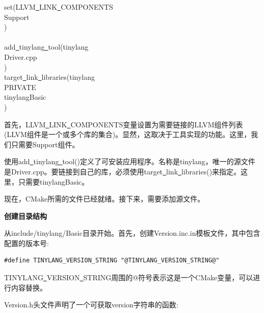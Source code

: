 \begin{tcolorbox}[colback=white,colframe=black]
set(LLVM\underline{~}LINK\underline{~}COMPONENTS\\
\hspace*{0.5cm}Support\\
)\\
\\
add\underline{~}tinylang\underline{~}tool(tinylang\\
\hspace*{0.5cm}Driver.cpp\\
) \\

target\underline{~}link\underline{~}libraries(tinylang \\
\hspace*{0.5cm}PRIVATE\\
\hspace*{0.5cm}tinylangBasic\\
)
\end{tcolorbox}

首先，LLVM\underline{~}LINK\underline{~}COMPONENTS变量设置为需要链接的LLVM组件列表(LLVM组件是一个或多个库的集合)。显然，这取决于工具实现的功能。这里，我们只需要Support组件。\par

使用add\underline{~}tinylang\underline{~}tool()定义了可安装应用程序。名称是tinylang，唯一的源文件是Driver.cpp。要链接到自己的库，必须使用target\underline{~}link\underline{~}libraries()来指定。这里，只需要tinylangBasic。\par

现在，CMake所需的文件已经就绪。接下来，需要添加源文件。\par

\hspace*{\fill} \par %
\textbf{创建目录结构}

从include/tinylang/Basic目录开始。首先，创建Version.inc.in模板文件，其中包含配置的版本号:\par

\begin{lstlisting}[caption={}]
#define TINYLANG_VERSION_STRING "@TINYLANG_VERSION_STRING@"
\end{lstlisting}

TINYLANG\underline{~}VERSION\underline{~}STRING周围的@符号表示这是一个CMake变量，可以进行内容替换。\par

Version.h头文件声明了一个可获取version字符串的函数:\par

